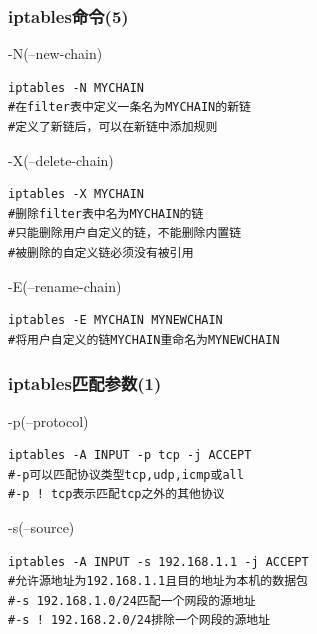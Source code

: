 \documentclass[xcolor=svgnames,presentation]{beamer}
\begin{document}
\begin{frame}[fragile]
\frametitle{iptables命令(5)}
\label{sec-2-18}
\begin{exampleblock}{-N(--new-chain)}
\label{sec-2-18-1}


\begin{verbatim}
iptables -N MYCHAIN
#在filter表中定义一条名为MYCHAIN的新链
#定义了新链后，可以在新链中添加规则
\end{verbatim}
\end{exampleblock}
\begin{block}{-X(--delete-chain)}
\label{sec-2-18-2}


\begin{verbatim}
iptables -X MYCHAIN
#删除filter表中名为MYCHAIN的链
#只能删除用户自定义的链，不能删除内置链
#被删除的自定义链必须没有被引用
\end{verbatim}
\end{block}
\begin{exampleblock}{-E(--rename-chain)}
\label{sec-2-18-3}


\begin{verbatim}
iptables -E MYCHAIN MYNEWCHAIN
#将用户自定义的链MYCHAIN重命名为MYNEWCHAIN
\end{verbatim}
\end{exampleblock}
\end{frame}
\begin{frame}[fragile]
\frametitle{iptables匹配参数(1)}
\label{sec-2-19}
\begin{exampleblock}{-p(--protocol)}
\label{sec-2-19-1}


\begin{verbatim}
iptables -A INPUT -p tcp -j ACCEPT
#-p可以匹配协议类型tcp,udp,icmp或all
#-p ! tcp表示匹配tcp之外的其他协议
\end{verbatim}
\end{exampleblock}
\begin{block}{-s(--source)}
\label{sec-2-19-2}


\begin{verbatim}
iptables -A INPUT -s 192.168.1.1 -j ACCEPT
#允许源地址为192.168.1.1且目的地址为本机的数据包
#-s 192.168.1.0/24匹配一个网段的源地址
#-s ! 192.168.2.0/24排除一个网段的源地址
\end{verbatim}
\end{block}
\end{frame}
\end{document}
